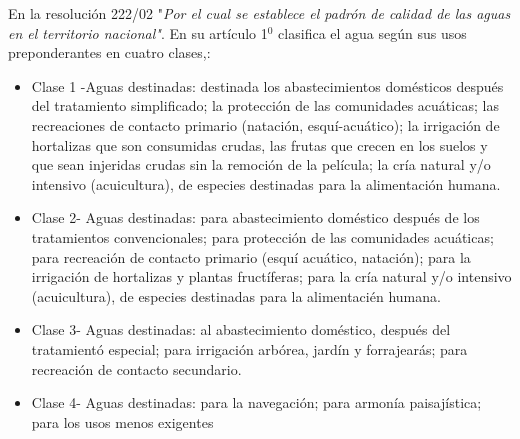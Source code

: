 En la resoluci\'on 222/02 "\textit{Por el cual se establece el padr\'on de calidad de las aguas en el territorio nacional"}. En su art\'iculo 1$^{0}$ clasifica el agua seg\'un sus usos preponderantes en cuatro clases,\cite{la-secretaria-del-ambiente-2002}:
\begin{itemize}
    \item Clase 1 -Aguas destinadas: 
    destinada los abastecimientos dom\'esticos despu\'es del tratamiento simplificado; 
    la protecci\'on de las comunidades acu\'aticas;
    las recreaciones de contacto primario (nataci\'on, esqu\'i-acu\'atico);
    la irrigaci\'on de hortalizas que son consumidas crudas, las frutas que crecen en los suelos y que sean injeridas crudas sin la remoci\'on de la pel\'icula; 
    la cr\'ia natural y/o intensivo (acuicultura), de especies destinadas para la alimentaci\'on humana.
    \item Clase 2- Aguas destinadas:
    para abastecimiento dom\'estico después de los tratamientos convencionales; 
    para protección de las comunidades acuáticas; para recreación de contacto primario (esquí acuático, natación); 
    para la irrigación de hortalizas y plantas fruct\'iferas; 
    para la cría natural y/o intensivo (acuicultura), de especies destinadas para la alimentaci\'en humana.
    \item Clase 3- Aguas destinadas: 
    al abastecimiento dom\'estico, despu\'es del tratamient\'o especial; 
    para irrigación arbórea, jardín y forrajear\'as; 
    para recreaci\'on de contacto secundario.
    \item Clase 4- Aguas destinadas: 
    para la navegación; 
    para armonía paisaj\'istica; 
    para los usos menos exigentes
\end{itemize}

